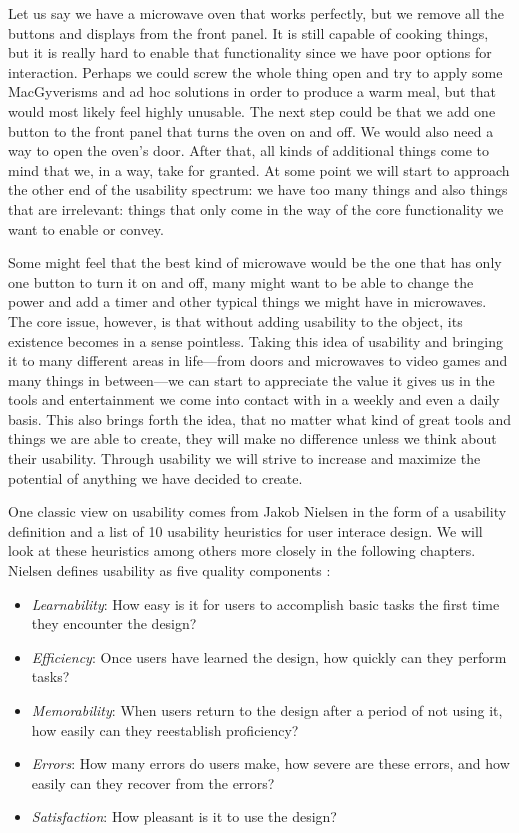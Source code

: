 Let us say we have a microwave oven that works perfectly, but we remove all the buttons and displays from the front panel. It is still capable of cooking things, but it is really hard to enable that functionality since we have poor options for interaction. Perhaps we could screw the whole thing open and try to apply some MacGyverisms and ad hoc solutions in order to produce a warm meal, but that would most likely feel highly unusable. The next step could be that we add one button to the front panel that turns the oven on and off. We would also need a way to open the oven's door. After that, all kinds of additional things come to mind that we, in a way, take for granted. At some point we will start to approach the other end of the usability spectrum: we have too many things and also things that are irrelevant: things that only come in the way of the core functionality we want to enable or convey. 

Some might feel that the best kind of microwave would be the one that has only one button to turn it on and off, many might want to be able to change the power and add a timer and other typical things we might have in microwaves. The core issue, however, is that without adding usability to the object, its existence becomes in a sense pointless. Taking this idea of usability and bringing it to many different areas in life---from doors and microwaves to video games and many things in between---we can start to appreciate the value it gives us in the tools and entertainment we come into contact with in a weekly and even a daily basis. This also brings forth the idea, that no matter what kind of great tools and things we are able to create, they will make no difference unless we think about their usability. Through usability we will strive to increase and maximize the potential of anything we have decided to create.

One classic view on usability comes from Jakob Nielsen in the form of a usability definition and a list of 10 usability heuristics for user interace design. We will look at these heuristics among others more closely in the following chapters. Nielsen defines usability as five quality components \cite{Nielsen2012}:

\begin{itemize}
	\item \textit{Learnability}: How easy is it for users to accomplish basic tasks the first time they encounter the design?
	\item \textit{Efficiency}: Once users have learned the design, how quickly can they perform tasks?
	\item \textit{Memorability}: When users return to the design after a period of not using it, how easily can they reestablish proficiency?
	\item \textit{Errors}: How many errors do users make, how severe are these errors, and how easily can they recover from the errors?
	\item \textit{Satisfaction}: How pleasant is it to use the design?
\end{itemize}

